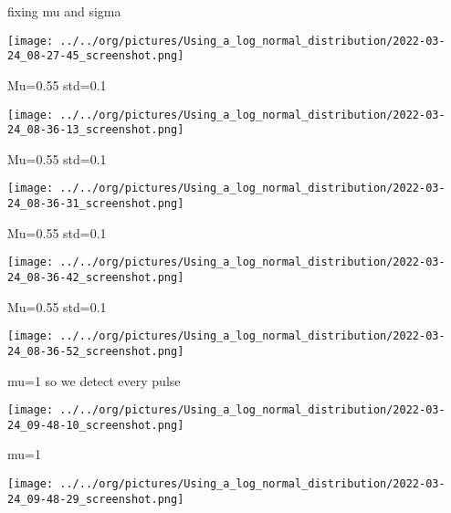 \documentclass[presentation]{beamer}
\begin{document}
\begin{frame}[label={sec:org4e0976b}]{fixing mu and sigma}
\begin{center}
\texttt{[image: ../../org/pictures/Using\_a\_log\_normal\_distribution/2022-03-24\_08-27-45\_screenshot.png]}
\end{center}
\end{frame}
\begin{frame}[label={sec:org181550e}]{Mu=0.55 std=0.1}
\begin{center}
\texttt{[image: ../../org/pictures/Using\_a\_log\_normal\_distribution/2022-03-24\_08-36-13\_screenshot.png]}
\end{center}
\end{frame}
\begin{frame}[label={sec:org9ff5176}]{Mu=0.55 std=0.1}
\begin{center}
\texttt{[image: ../../org/pictures/Using\_a\_log\_normal\_distribution/2022-03-24\_08-36-31\_screenshot.png]}
\end{center}
\end{frame}
\begin{frame}[label={sec:org72d0bef}]{Mu=0.55 std=0.1}
\begin{center}
\texttt{[image: ../../org/pictures/Using\_a\_log\_normal\_distribution/2022-03-24\_08-36-42\_screenshot.png]}
\end{center}
\end{frame}
\begin{frame}[label={sec:org06c99f1}]{Mu=0.55 std=0.1}
\begin{center}
\texttt{[image: ../../org/pictures/Using\_a\_log\_normal\_distribution/2022-03-24\_08-36-52\_screenshot.png]}
\end{center}
\end{frame}
\begin{frame}[label={sec:org9ec9aa0}]{mu=1 so we detect every pulse}
\begin{center}
\texttt{[image: ../../org/pictures/Using\_a\_log\_normal\_distribution/2022-03-24\_09-48-10\_screenshot.png]}
\end{center}
\end{frame}
\begin{frame}[label={sec:orgebe6484}]{mu=1}
\begin{center}
\texttt{[image: ../../org/pictures/Using\_a\_log\_normal\_distribution/2022-03-24\_09-48-29\_screenshot.png]}
\end{center}
\end{frame}
\end{document}
